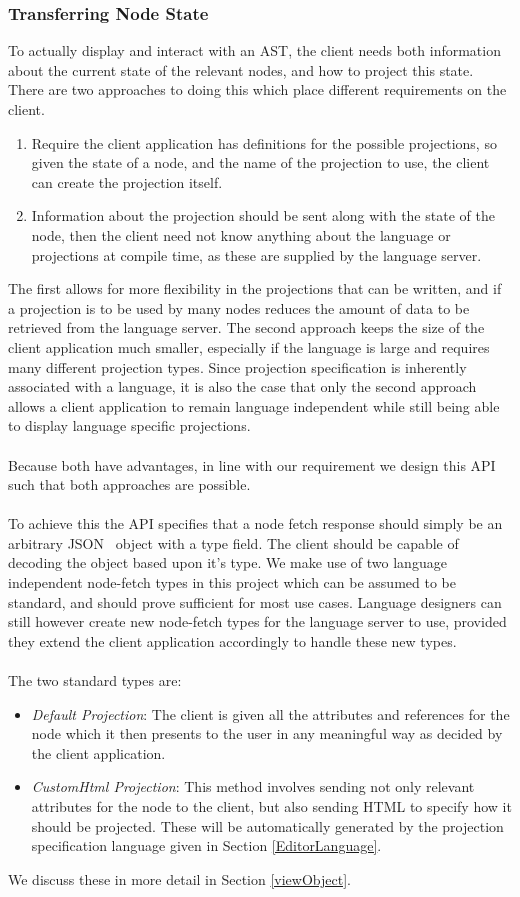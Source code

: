 \documentclass{article}
\begin{document}
{\subsubsection{Transferring Node State}\label{apiNodeStateTransfer}
To actually display and interact with an AST, the client needs both information about the current state of the relevant nodes, and how to project this state. There are two approaches to doing this which place different requirements on the client.
\begin{enumerate}
\item Require the client application has definitions for the possible projections, so given the state of a node, and the name of the projection to use, the client can create the projection itself.
\item Information about the projection should be sent along with the state of the node, then the client need not know anything about the language or projections at compile time, as these are supplied by the language server.
\end{enumerate}
The first allows for more flexibility in the projections that can be written, and if a projection is to be used by many nodes reduces the amount of data to be retrieved from the language server. The second approach keeps the size of the client application much smaller, especially if the language is large and requires many different projection types. Since projection specification is inherently associated with a language, it is also the case that only the second approach allows a client application to remain language independent while still being able to display language specific projections.
\\
\\
Because both have advantages, in line with our \RCustom requirement we design this API such that both approaches are possible.
\\
\\
To achieve this the API specifies that a node fetch response should simply be an arbitrary JSON~\cite{json} object with a type field. The client should be capable of decoding the object based upon it's type. We make use of two language independent node-fetch types in this project which can be assumed to be standard, and should prove sufficient for most use cases. Language designers can still however create new node-fetch types for the language server to use, provided they extend the client application accordingly to handle these new types. 
\\
\\
The two standard types are:
\begin{itemize}
\item \emph{Default Projection}: The client is given all the attributes and references for the node which it then presents to the user in any meaningful way as decided by the client application.
\item \emph{CustomHtml Projection}: This method involves sending not only relevant attributes for the node to the client, but also sending HTML to specify how it should be projected. These will be automatically generated by the projection specification language given in Section \ref{EditorLanguage}.
\end{itemize}
We discuss these in more detail in Section \ref{viewObject}.
}
\end{document}

